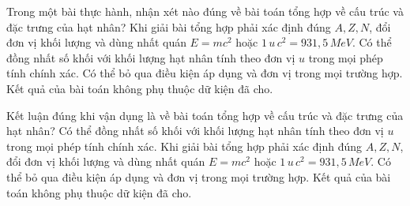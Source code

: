 \begin{ex}
Trong một bài thực hành, nhận xét nào đúng về bài toán tổng hợp về cấu trúc và đặc trưng của hạt nhân?
\choice
{\True Khi giải bài tổng hợp phải xác định đúng $A,Z,N$, đổi đơn vị khối lượng và dùng nhất quán $E=mc^2$ hoặc $1\,u\,c^2=931,5\,MeV$.}
{Có thể đồng nhất số khối với khối lượng hạt nhân tính theo đơn vị $u$ trong mọi phép tính chính xác.}
{Có thể bỏ qua điều kiện áp dụng và đơn vị trong mọi trường hợp.}
{Kết quả của bài toán không phụ thuộc dữ kiện đã cho.}
\end{ex}

\begin{ex}
Kết luận đúng khi vận dụng là về bài toán tổng hợp về cấu trúc và đặc trưng của hạt nhân?
\choice
{Có thể đồng nhất số khối với khối lượng hạt nhân tính theo đơn vị $u$ trong mọi phép tính chính xác.}
{\True Khi giải bài tổng hợp phải xác định đúng $A,Z,N$, đổi đơn vị khối lượng và dùng nhất quán $E=mc^2$ hoặc $1\,u\,c^2=931,5\,MeV$.}
{Có thể bỏ qua điều kiện áp dụng và đơn vị trong mọi trường hợp.}
{Kết quả của bài toán không phụ thuộc dữ kiện đã cho.}
\end{ex}
